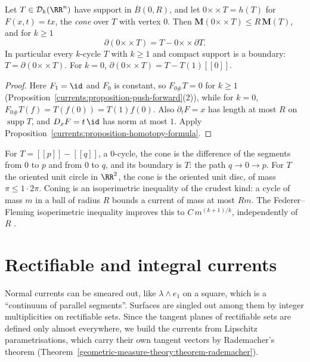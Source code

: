 \begin{corollary}[Cones]\label{currents:corollary-cone}
Let $T \in \mathcal{D}_k(\RR^n)$ have support in $\overline{B}(0, R)$, and let $0 \mathbin{\times\!\!\!\!\times} T = h(T)$ for $F(x, t) = tx$, the \emph{cone} over $T$ with vertex $0$. Then
$\mathbf{M}(0 \mathbin{\times\!\!\!\!\times} T) \leq R\,\mathbf{M}(T)$, and for $k \geq 1$
\[
\partial(0 \mathbin{\times\!\!\!\!\times} T) = T - 0 \mathbin{\times\!\!\!\!\times} \partial T .
\]
In particular every $k$-cycle $T$ with $k \geq 1$ and compact support is a boundary: $T = \partial(0 \mathbin{\times\!\!\!\!\times} T)$. For $k = 0$, $\partial(0 \mathbin{\times\!\!\!\!\times} T) = T - T(1)[\![0]\!]$.
\end{corollary}

\begin{proof}
Here $F_1 = \id$ and $F_0$ is constant, so $F_{0\#}T = 0$ for $k \geq 1$ (Proposition~\ref{currents:proposition-push-forward}(2)), while for $k = 0$, $F_{0\#}T(f) = T(f(0)) = T(1)f(0)$. Also $\partial_tF = x$ has length at
most $R$ on $\operatorname{supp}T$, and $D_xF = t\,\id$ has norm at most $1$. Apply Proposition~\ref{currents:proposition-homotopy-formula}.
\end{proof}

\begin{example}\label{currents:example-cone}
For $T = [\![p]\!] - [\![q]\!]$, a $0$-cycle, the cone is the difference of the segments from $0$ to $p$ and from $0$ to $q$, and its boundary is $T$: the path $q \to 0 \to p$. For $T$ the oriented unit circle in
$\RR^2$, the cone is the oriented unit disc, of mass $\pi \leq 1 \cdot 2\pi$. Coning is an isoperimetric inequality of the crudest kind: a cycle of mass $m$ in a ball of radius $R$ bounds a current of mass at
most $Rm$. The Federer--Fleming isoperimetric inequality improves this to $C\,m^{(k+1)/k}$, independently of $R$ \cite{federer-fleming-1960}.
\end{example}

\section{Rectifiable and integral currents}\label{currents:section-rectifiable}

Normal currents can be smeared out, like $\lambda \wedge e_1$ on a square, which is a ``continuum of parallel segments''. Surfaces are singled out among them by integer multiplicities on rectifiable sets. Since
the tangent planes of rectifiable sets are defined only almost everywhere, we build the currents from Lipschitz parametrisations, which carry their own tangent vectors by Rademacher's theorem
(Theorem~\ref{geometric-measure-theory:theorem-rademacher}).


